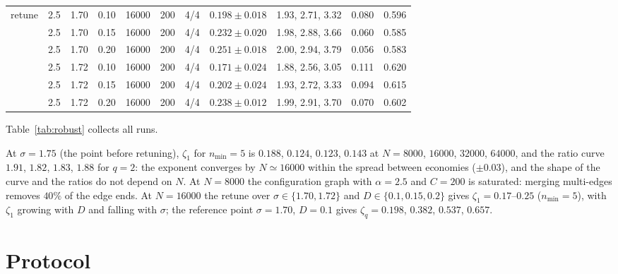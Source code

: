 \documentclass[pre,twocolumn,superscriptaddress,nofootinbib]{revtex4-2}
\begin{document}
\begin{table}[t]
\begin{ruledtabular}
\begin{tabular}{lcccccccccc}
\hline
retune & 2.5 & 1.70 & 0.10 & 16000 & 200 & 4/4 & $0.198\pm0.018$ & 1.93, 2.71, 3.32 & 0.080 & 0.596\\
 & 2.5 & 1.70 & 0.15 & 16000 & 200 & 4/4 & $0.232\pm0.020$ & 1.98, 2.88, 3.66 & 0.060 & 0.585\\
 & 2.5 & 1.70 & 0.20 & 16000 & 200 & 4/4 & $0.251\pm0.018$ & 2.00, 2.94, 3.79 & 0.056 & 0.583\\
 & 2.5 & 1.72 & 0.10 & 16000 & 200 & 4/4 & $0.171\pm0.024$ & 1.88, 2.56, 3.05 & 0.111 & 0.620\\
 & 2.5 & 1.72 & 0.15 & 16000 & 200 & 4/4 & $0.202\pm0.024$ & 1.93, 2.72, 3.33 & 0.094 & 0.615\\
 & 2.5 & 1.72 & 0.20 & 16000 & 200 & 4/4 & $0.238\pm0.012$ & 1.99, 2.91, 3.70 & 0.070 & 0.602\\
\end{tabular}
\end{ruledtabular}
\end{table}

Table~\ref{tab:robust} collects all runs.

At $\sigma=1.75$ (the point before retuning), $\zeta_1$ for $n_{\min}=5$ is $0.188$, $0.124$, $0.123$, $0.143$ at
$N=8000$, $16000$, $32000$, $64000$, and the ratio curve $1.91$, $1.82$, $1.83$, $1.88$ for $q=2$: the
exponent converges by $N\simeq16000$ within the spread between economies ($\pm0.03$), and the shape of
the curve and the ratios do not depend on $N$.  At $N=8000$ the configuration graph with $\alpha=2.5$ and
$C=200$ is saturated: merging multi-edges removes $40\%$ of the edge ends.  At $N=16000$ the retune over
$\sigma\in\{1.70,1.72\}$ and $D\in\{0.1,0.15,0.2\}$ gives $\zeta_1=0.17$--$0.25$ ($n_{\min}=5$), with $\zeta_1$ growing
with $D$ and falling with $\sigma$; the reference point $\sigma=1.70$, $D=0.1$ gives $\zeta_q=0.198$, $0.382$, $0.537$,
$0.657$.

\section{Protocol}
\label{app:protocol}
\end{document}

